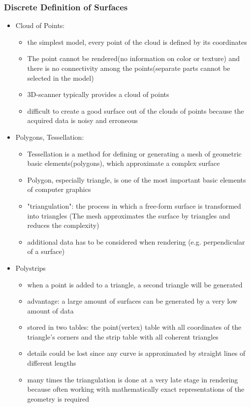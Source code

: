 \documentclass[12pt]{article}
\begin{document}
\subsubsection*{Discrete Definition of Surfaces}
\begin{itemize}
	\item Cloud of Points:
	\begin{itemize}
		\item the simplest model, every point of the cloud is defined by its coordinates
		\item The point cannot be rendered(no information on color or texture) and there is no connectivity among the points(separate parts cannot be selected in the model)
		\item 3D-scanner typically provides a cloud of points
		\item difficult to create a good surface out of the clouds of points because the acquired data is noisy and erroneous
	\end{itemize}
	\item Polygons, Tessellation:
	\begin{itemize}
		\item Tessellation is a method for defining or generating a mesh of geometric basic elements(polygons), which approximate a complex surface
		\item Polygon, especially triangle, is one of the most important basic elements of computer graphics
		\item "triangulation": the process in which a free-form surface is transformed into triangles (The mesh approximates the surface by triangles and reduces the complexity)
		\item additional data has to be considered when rendering (e.g. perpendicular of a surface)
	\end{itemize}
	\item Polystrips
	\begin{itemize}
		\item when a point is added to a triangle, a second triangle will be generated
		\item advantage: a large amount of surfaces can be generated by a very low amount of data
		\item stored in two tables: the point(vertex) table with all coordinates of the triangle's corners and the strip table with all coherent triangles
		\item details could be lost since any curve is approximated by straight lines of different lengths
		\item many times the triangulation is done at a very late stage in rendering because often working with mathematically exact representations of the geometry is required
	\end{itemize}
\end{itemize}
\end{document}
